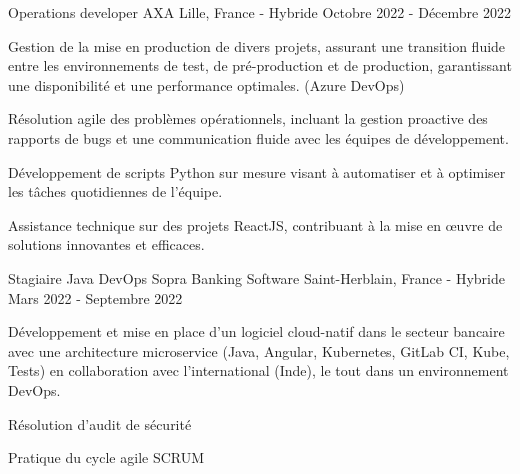 \begin{cventries}
  \cventry
    {Operations developer} %
    {AXA} %
    {Lille, France - Hybride} %
    {Octobre 2022 - Décembre 2022} %
    {
      \begin{cvitems} %
        \item {Gestion de la mise en production de divers projets, assurant une transition fluide entre les environnements de test, de pré-production et de production, garantissant une disponibilité et une performance optimales. (Azure DevOps)}
        \item {Résolution agile des problèmes opérationnels, incluant la gestion proactive des rapports de bugs et une communication fluide avec les équipes de développement.}
        \item {Développement de scripts Python sur mesure visant à automatiser et à optimiser les tâches quotidiennes de l'équipe.}
        \item {Assistance technique sur des projets ReactJS, contribuant à la mise en œuvre de solutions innovantes et efficaces.}
      \end{cvitems}
    }

  \cventry
    {Stagiaire Java DevOps} %
    {Sopra Banking Software} %
    {Saint-Herblain, France - Hybride} %
    {Mars 2022 - Septembre 2022} %
    {
      \begin{cvitems} %
        \item {Développement et mise en place d'un logiciel cloud-natif dans le secteur bancaire avec une architecture microservice (Java, Angular, Kubernetes, GitLab CI, Kube, Tests) en collaboration avec l'international (Inde), le tout dans un environnement DevOps.}
        \item {Résolution d'audit de sécurité}
        \item {Pratique du cycle agile SCRUM}
      \end{cvitems}
    }
    


\end{cventries}
